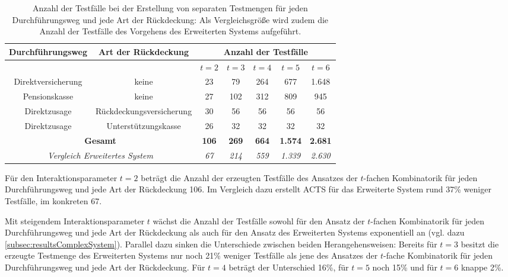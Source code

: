 \renewcommand{\arraystretch}{2}
\begin{table}[!htb]
\footnotesize
\begin{tabular}{|c|c|c|c|c|c|c|}
\hline
\cellcolor{grauinfo}Durchführungsweg   & \cellcolor{grauinfo}Art der Rückdeckung      & \multicolumn{5}{c|}{\cellcolor{grauinfo}Anzahl der Testfälle} \\ \hline
				   &                          & \textit{$t=2$}  & \textit{$t=3$}  & \textit{$t=4$ } & \textit{$t=5$} & \textit{$t=6$} \\ \hline
Direktversicherung & keine                    & 23     & 79     & 264    & 677   & 1.648  \\ \hline
Pensionskasse      & keine                    & 27     & 102    & 312    & 809   & 945   \\ \hline
Direktzusage       & Rückdeckungsversicherung & 30     & 56     & 56     & 56    & 56    \\ \hline
Direktzusage       & Unterstützungskasse      & 26     & 32     & 32     & 32    & 32    \\ \hline
\multicolumn{2}{|c|}{\textbf{Gesamt}}                    & \textbf{106}    & \textbf{269}    & \textbf{664}    & \textbf{1.574}  & \textbf{2.681}  \\ \hline \hline
\multicolumn{2}{|c|}{\scriptsize\textit{ Vergleich Erweitertes System}}                    & \scriptsize \textit{67}    & \scriptsize \textit{214}    & \scriptsize \textit{559}    & \scriptsize \textit{1.339}  & \scriptsize \textit{2.630}  \\ \hline
\end{tabular}
\caption{Anzahl der Testfälle bei der Erstellung von separaten Testmengen für jeden Durchführungsweg und jede Art der Rückdeckung: Als Vergleichsgröße wird zudem die Anzahl der Testfälle des Vorgehens des Erweiterten Systems aufgeführt.}
\label{tab:ergebnisseFullCombination}
\end{table}
\renewcommand{\arraystretch}{1.5}

Für den Interaktionsparameter $t=2$ beträgt die Anzahl der erzeugten Testfälle des Ansatzes der $t$-fachen Kombinatorik für jeden Durchführungsweg und jede Art der Rückdeckung 106. Im Vergleich dazu erstellt ACTS für das Erweiterte System rund 37\% weniger Testfälle, im konkreten 67.

Mit steigendem Interaktionsparameter $t$ wächst die Anzahl der Testfälle sowohl für den Ansatz der $t$-fachen Kombinatorik für jeden Durchführungsweg und jede Art der Rückdeckung als auch für den Ansatz des Erweiterten Systems exponentiell an (vgl. dazu \autoref{subsec:resultsComplexSystem}). Parallel dazu sinken die Unterschiede zwischen beiden Herangehensweisen: Bereits für $t=3$ besitzt die erzeugte Testmenge des Erweiterten Systems nur noch 21\% weniger Testfälle als jene des Ansatzes der $t$-fache Kombinatorik für jeden Durchführungsweg und jede Art der Rückdeckung. Für $t=4$ beträgt der Unterschied 16\%, für $t=5$ noch 15\% und für $t=6$ knappe 2\%.

